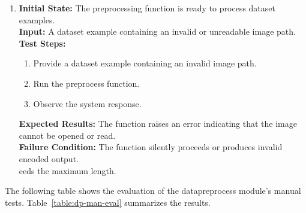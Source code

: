 \documentclass[12pt, titlepage]{article}
\begin{document}
\begin{enumerate}[label=DP-MT \arabic*., wide=0pt, leftmargin=*]
  \item{}
    {\bf Initial State:} The preprocessing function is ready to
    process dataset examples. \\
    {\bf Input:} A dataset example containing an invalid or
    unreadable image path. \\
    {\bf Test Steps:}
    \begin{enumerate}
      \item Provide a dataset example containing an invalid image path.
      \item Run the preprocess function.
      \item Observe the system response.
    \end{enumerate}
    {\bf Expected Results:} The function raises an error indicating
    that the image cannot be opened or read. \\
    {\bf Failure Condition:} The function silently proceeds or
    produces invalid encoded output. \\
    eeds the maximum length. \\
\end{enumerate}

The following table shows the evaluation of the datapreprocess
module’s manual tests. Table~\ref{table:dp-man-eval} summarizes the results.

\newcommand{\dpmantestcount}{\stepcounter{dpmantestcase}\thedpmantestcase}
\end{document}
